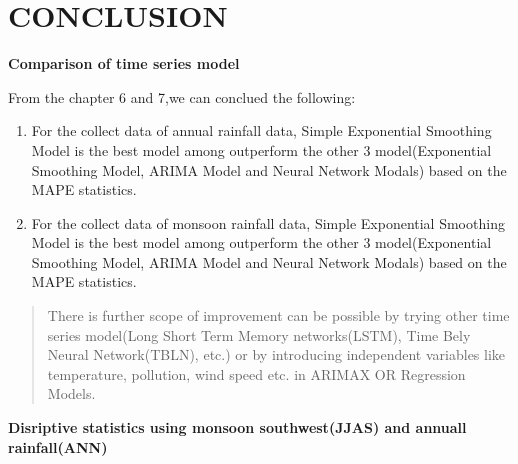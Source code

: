 \documentclass[12pt,openany]{book}
\providecommand{\tightlist}{%
  \setlength{\itemsep}{0pt}\setlength{\parskip}{0pt}}
\begin{document}
\hypertarget{conclusion}{%
\chapter{CONCLUSION}\label{conclusion}}

\textbf{Comparison of time series model}

From the chapter 6 and 7,we can conclued the following:

\begin{enumerate}
\def\labelenumi{\arabic{enumi}.}
\tightlist
\item
  For the collect data of annual rainfall data, Simple Exponential Smoothing Model is the best model among outperform the other 3 model(Exponential Smoothing Model, ARIMA Model and Neural Network Modals) based on the MAPE statistics.
\item
  For the collect data of monsoon rainfall data, Simple Exponential Smoothing Model is the best model among outperform the other 3 model(Exponential Smoothing Model, ARIMA Model and Neural Network Modals) based on the MAPE statistics.
\end{enumerate}

\begin{quote}
There is further scope of improvement can be possible by trying other time series model(Long Short Term Memory networks(LSTM), Time Bely Neural Network(TBLN), etc.) or by introducing independent variables like temperature, pollution, wind speed etc. in ARIMAX OR Regression Models.
\end{quote}

\textbf{Disriptive statistics using monsoon southwest(JJAS) and annuall rainfall(ANN)}
\end{document}
